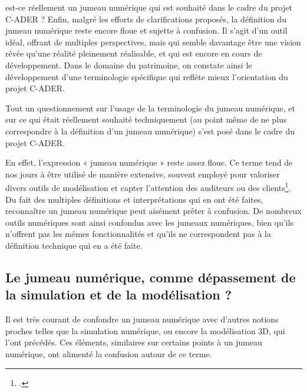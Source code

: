 
est-ce réellement un jumeau numérique qui est souhaité dans le cadre du projet C-ADER ? Enfin, malgré les efforts de clarifications proposés, la définition du jumeau numérique reste encore floue et sujette à confusion. Il s'agit d'un outil idéal, offrant de multiples perspectives, mais qui semble davantage être une vision rêvée qu'une réalité pleinement réalisable, et qui est encore en cours de développement. Dans le domaine du patrimoine, on constate ainsi le développement d'une terminologie spécifique qui reflète mieux l'orientation du projet C-ADER.


Tout un questionnement sur l'usage de la terminologie du jumeau numérique, et sur ce qui était réellement souhaité techniquement (au point même de ne plus correspondre à la définition d'un jumeau numérique) s'est posé dans le cadre du projet C-ADER. 

En effet, l’expression « jumeau numérique » reste assez floue. Ce terme tend de nos jours à être utilisé de manière extensive, souvent employé pour valoriser divers outils de modélisation et capter l'attention des auditeurs ou des clients\footcite{PremiersJoursJumeaux}. Du fait des multiples définitions et interprétations qui en ont été faites, reconnaître un jumeau numérique peut aisément prêter à confusion. De nombreux outils numériques sont ainsi confondus avec les jumeaux numériques, bien qu'ils n'offrent pas les mêmes fonctionnalités et qu'ils ne correspondent pas à la définition technique qui en a été faite.

        \subsection{Le jumeau numérique, comme dépassement de la simulation et de la modélisation ?}

Il est très courant de confondre un jumeau numérique avec d'autres notions proches telles que la simulation numérique, ou encore la modélisation 3D, qui l'ont précédés. Ces éléments, similaires sur certains points à un jumeau numérique, ont alimenté la confusion autour de ce terme.\\


